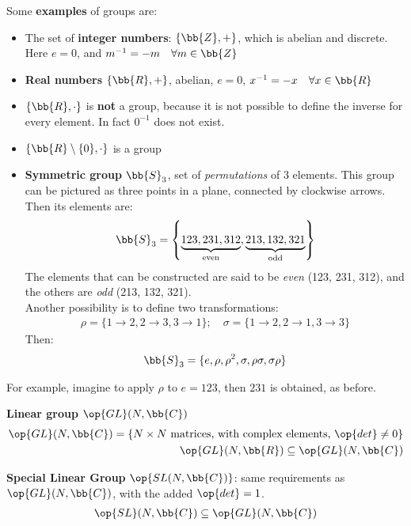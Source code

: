 \documentclass[../Theoretical.tex]{subfiles}
\begin{document}
Some \textbf{examples} of groups are:
\begin{itemize}
\item The set of \textbf{integer numbers}: $\{\bb{Z},+\}$, which is abelian and discrete. Here $e=0$, and $m^{-1}=-m\quad \forall m \in \bb{Z}$
\item \textbf{Real numbers} $\{\bb{R},+\}$, abelian, $e=0$, $x^{-1}=-x\quad \forall x\in \bb{R}$
\item $\{\bb{R},\cdot\}$ is \textbf{not} a group, because it is not possible to define the inverse for every element. In fact $0^{-1}$ does not exist.
\item $\{\bb{R}\setminus \{0\},\cdot\}$ is a group
\item \textbf{Symmetric group} $\bb{S}_3$, set of \textit{permutations} of $3$ elements. This group can be pictured as three points in a plane, connected by clockwise arrows. Then its elements are:
\begin{align*}
\bb{S}_3 = \left\{\underbrace{123,231,312}_{\mathrm{even}},\underbrace{213,132,321}_{\mathrm{odd}}\right\}
\end{align*}
The elements that can be constructed  are said to be \textit{even} (123, 231, 312), and the others are \textit{odd} (213, 132, 321).\\
Another possibility is to define two transformations:
\begin{align*}
\rho = \{1\to 2, 2\to 3, 3\to 1\}; \quad \sigma=\{1\to 2,2\to 1, 3\to 3\}
\end{align*}
Then:
\begin{align*}
\bb{S}_3 = \{e,\rho, \rho^2, \sigma, \rho\sigma, \sigma\rho\}
\end{align*}
\end{itemize}
For example, imagine to apply $\rho$ to $e=123$, then $231$ is obtained, as before.


\begin{dfn}
\textbf{Linear group} $\op{GL}(N, \bb{C})$
\begin{align*}
\op{GL}(N,\bb{C}) = \{N\times N \text{ matrices, with complex elements, } \op{det}\neq 0\}\\
\op{GL}(N, \bb{R}) \subseteq \op{GL}(N,\bb{C}) 
\end{align*}
\end{dfn}

\begin{dfn}
\textbf{Special Linear Group} $\op{SL(N,\bb{C})}$: same requirements as $\op{GL}(N,\bb{C})$, with the added $\op{det} = 1$.
\begin{align*}
\op{SL}(N,\bb{C})\subseteq \op{GL}(N,\bb{C})
\end{align*}
\end{dfn}
\end{document}
